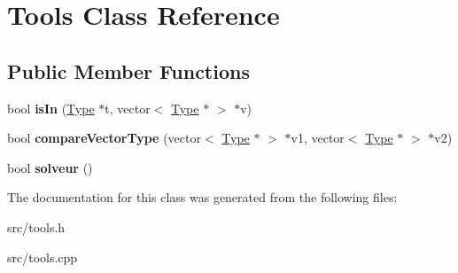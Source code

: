 \hypertarget{classTools}{\section{Tools Class Reference}
\label{classTools}
}
\subsection*{Public Member Functions}
\begin{DoxyCompactItemize}
\item 
\hypertarget{classTools_a82964e604c52b7a2250e8a5291fae80d}{bool {\bfseries is\+In} (\hyperlink{classType}{Type} $\ast$t, vector$<$ \hyperlink{classType}{Type} $\ast$ $>$ $\ast$v)}\label{classTools_a82964e604c52b7a2250e8a5291fae80d}

\item 
\hypertarget{classTools_a133831bc0b6c2c426a2beef303fe31d8}{bool {\bfseries compare\+Vector\+Type} (vector$<$ \hyperlink{classType}{Type} $\ast$ $>$ $\ast$v1, vector$<$ \hyperlink{classType}{Type} $\ast$ $>$ $\ast$v2)}\label{classTools_a133831bc0b6c2c426a2beef303fe31d8}

\item 
\hypertarget{classTools_a3e90b6d57c7bf280e371c866c74a804a}{bool {\bfseries solveur} ()}\label{classTools_a3e90b6d57c7bf280e371c866c74a804a}

\end{DoxyCompactItemize}


The documentation for this class was generated from the following files\+:\begin{DoxyCompactItemize}
\item 
src/tools.\+h\item 
src/tools.\+cpp\end{DoxyCompactItemize}
